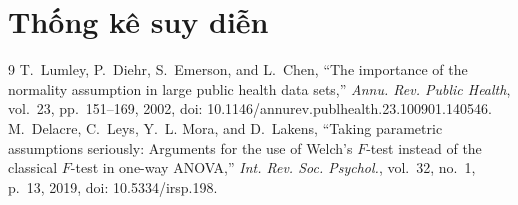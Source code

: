 \documentclass[12pt,a4paper]{article}
\begin{document}
\setcounter{section}{4}
\section{Thống kê suy diễn}


\begin{thebibliography}{9}
   T.~Lumley, P.~Diehr, S.~Emerson, and L.~Chen, ``The importance of
    the normality assumption in large public health data sets,'' \emph{Annu. Rev. Public
    Health}, vol.~23, pp.~151--169, 2002, doi: 10.1146/annurev.publhealth.23.100901.140546.
   M.~Delacre, C.~Leys, Y.~L. Mora, and D.~Lakens, ``Taking parametric
    assumptions seriously: Arguments for the use of Welch's $F$-test instead of the classical
    $F$-test in one-way ANOVA,'' \emph{Int. Rev. Soc. Psychol.}, vol.~32, no.~1, p.~13, 2019,
    doi: 10.5334/irsp.198.
\end{thebibliography}
\end{document}
